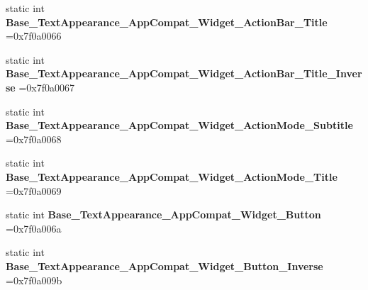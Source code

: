 \begin{DoxyCompactItemize}
\item 
\mbox{\label{classandroid_1_1support_1_1v7_1_1mediarouter_1_1R_1_1style_a53dda3ba1ab6d3c0a9d6ee4158a3a031}} 
static int {\bfseries Base\+\_\+\+Text\+Appearance\+\_\+\+App\+Compat\+\_\+\+Widget\+\_\+\+Action\+Bar\+\_\+\+Title} =0x7f0a0066
\item 
\mbox{\label{classandroid_1_1support_1_1v7_1_1mediarouter_1_1R_1_1style_a67669d162b474179645a8e69c1216e07}} 
static int {\bfseries Base\+\_\+\+Text\+Appearance\+\_\+\+App\+Compat\+\_\+\+Widget\+\_\+\+Action\+Bar\+\_\+\+Title\+\_\+\+Inverse} =0x7f0a0067
\item 
\mbox{\label{classandroid_1_1support_1_1v7_1_1mediarouter_1_1R_1_1style_a8af1abbb5d8eaa3fd97b7ffbc774f619}} 
static int {\bfseries Base\+\_\+\+Text\+Appearance\+\_\+\+App\+Compat\+\_\+\+Widget\+\_\+\+Action\+Mode\+\_\+\+Subtitle} =0x7f0a0068
\item 
\mbox{\label{classandroid_1_1support_1_1v7_1_1mediarouter_1_1R_1_1style_a5ca141d819a169d2ef96ee54b8ccf400}} 
static int {\bfseries Base\+\_\+\+Text\+Appearance\+\_\+\+App\+Compat\+\_\+\+Widget\+\_\+\+Action\+Mode\+\_\+\+Title} =0x7f0a0069
\item 
\mbox{\label{classandroid_1_1support_1_1v7_1_1mediarouter_1_1R_1_1style_aa4a4cee37eefaeb391bf7adef8939aed}} 
static int {\bfseries Base\+\_\+\+Text\+Appearance\+\_\+\+App\+Compat\+\_\+\+Widget\+\_\+\+Button} =0x7f0a006a
\item 
\mbox{\label{classandroid_1_1support_1_1v7_1_1mediarouter_1_1R_1_1style_af41c00ed3a32b79b0c6e97ffdd2eb33a}} 
static int {\bfseries Base\+\_\+\+Text\+Appearance\+\_\+\+App\+Compat\+\_\+\+Widget\+\_\+\+Button\+\_\+\+Inverse} =0x7f0a009b
\item 
\mbox{\label{classandroid_1_1support_1_1v7_1_1mediarouter_1_1R_1_1style_abd0fc75cf26e9a865e368ca7769f8e36}} 

\end{DoxyCompactItemize}
